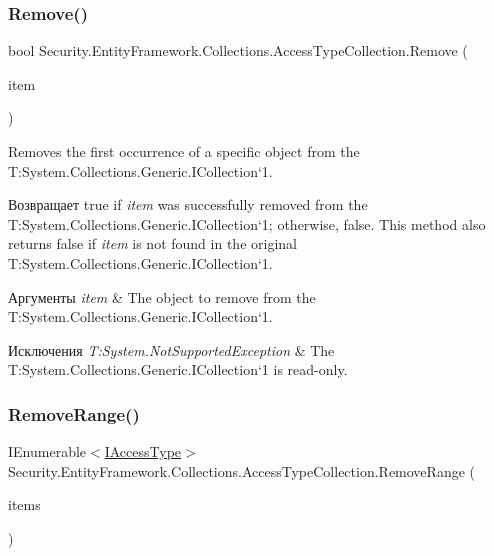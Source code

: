\subsubsection{\texorpdfstring{Remove()}{Remove()}}
{\footnotesize\ttfamily bool Security.\+Entity\+Framework.\+Collections.\+Access\+Type\+Collection.\+Remove (\begin{DoxyParamCaption}\item[{\hyperlink{interface_security_1_1_interfaces_1_1_model_1_1_i_access_type}{I\+Access\+Type}}]{item }\end{DoxyParamCaption})}



Removes the first occurrence of a specific object from the T\+:\+System.\+Collections.\+Generic.\+I\+Collection`1. 

\begin{DoxyReturn}{Возвращает}
true if {\itshape item}  was successfully removed from the T\+:\+System.\+Collections.\+Generic.\+I\+Collection`1; otherwise, false. This method also returns false if {\itshape item}  is not found in the original T\+:\+System.\+Collections.\+Generic.\+I\+Collection`1. 
\end{DoxyReturn}

\begin{DoxyParams}{Аргументы}
{\em item} & The object to remove from the T\+:\+System.\+Collections.\+Generic.\+I\+Collection`1.\\
\hline
\end{DoxyParams}

\begin{DoxyExceptions}{Исключения}
{\em T\+:\+System.\+Not\+Supported\+Exception} & The T\+:\+System.\+Collections.\+Generic.\+I\+Collection`1 is read-\/only.\\
\hline
\end{DoxyExceptions}
\mbox{\label{class_security_1_1_entity_framework_1_1_collections_1_1_access_type_collection_a945ba748eb8960ac57a43ce6c266568b}} 
\subsubsection{\texorpdfstring{Remove\+Range()}{RemoveRange()}}
{\footnotesize\ttfamily I\+Enumerable$<$\hyperlink{interface_security_1_1_interfaces_1_1_model_1_1_i_access_type}{I\+Access\+Type}$>$ Security.\+Entity\+Framework.\+Collections.\+Access\+Type\+Collection.\+Remove\+Range (\begin{DoxyParamCaption}\item[{I\+Enumerable$<$ \hyperlink{interface_security_1_1_interfaces_1_1_model_1_1_i_access_type}{I\+Access\+Type} $>$}]{items }\end{DoxyParamCaption})}



